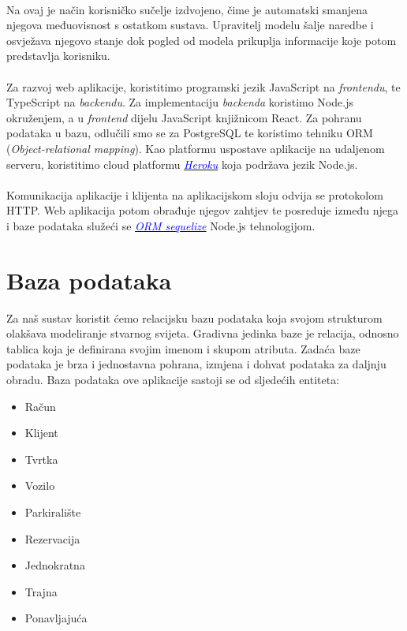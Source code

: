 		\paragraph{}
		
		Na ovaj je način korisničko sučelje izdvojeno, čime je automatski smanjena njegova međuovisnost s ostatkom sustava. Upravitelj modelu šalje naredbe i osvježava njegovo stanje dok pogled od modela prikuplja informacije koje potom predstavlja korisniku.  
		
		\paragraph{}
		
		Za razvoj web aplikacije, koristitimo programski jezik JavaScript na \textit{frontendu}, te TypeScript na \textit{backendu}. Za implementaciju \textit{backenda} koristimo Node.js okruženjem, a u \textit{frontend} dijelu JavaScript knjižnicom React. Za pohranu podataka u bazu, odlučili smo se za PostgreSQL te koristimo tehniku ORM (\textit{Object-relational mapping}).
		Kao platformu uspostave aplikacije na udaljenom serveru, koristitimo cloud platformu \href{https://dashboard.heroku.com/apps}{\textit{\textcolor{blue}{Heroku}}} koja podržava jezik Node.js.
		
		\paragraph{}
		
		Komunikacija aplikacije i klijenta na aplikacijskom sloju odvija se protokolom HTTP. Web aplikacija potom obrađuje njegov zahtjev te posreduje između njega i baze podataka služeći se \href{https://sequelize.org/}{\textit{\textcolor{blue}{ORM sequelize}}} Node.js tehnologijom.

		

		\pagebreak		
		\section{Baza podataka}
			
		Za naš sustav koristit ćemo relacijsku bazu podataka koja svojom strukturom olakšava modeliranje stvarnog svijeta. Gradivna jedinka baze je relacija, odnosno tablica koja je definirana svojim imenom i skupom atributa. Zadaća baze podataka je brza i jednostavna pohrana, izmjena i dohvat podataka za daljnju obradu.
		\newline
        Baza podataka ove aplikacije sastoji se od sljedećih entiteta: 
        \begin{itemize}
            \item Račun
            \item Klijent
            \item Tvrtka
            \item Vozilo
            \item Parkiralište
            \item Rezervacija
            \item Jednokratna
            \item Trajna
            \item Ponavljajuća
        \end{itemize}
        
